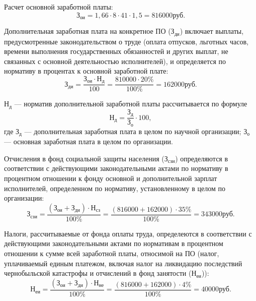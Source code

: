 Расчет основной заработной платы:
\begin{displaymath}
  \text{З}_{\text{ои}} = 1,66 \cdot 8 \cdot 41 \cdot 1,5 = 816000 \text{руб}.
\end{displaymath}

Дополнительная заработная плата на конкретное ПО (\( \text{З}_{\text{ди}} \)) включает выплаты, предусмотренные законодательством о труде (оплата отпусков, льготных часов, времени выполнения государственных обязанностей и других выплат, не связанных с основной деятельностью исполнителей), и определяется по нормативу в процентах к основной заработной плате:
\begin{displaymath}
  \text{З}_{\text{ди}} = \frac{\text{З}_{\text{ои}} \cdot \text{Н}_{\text{д}}}{100} = \frac{810000 \cdot 20\%}{100\%} = 162000 \text{руб.}
\end{displaymath}

\( \text{Н}_{\text{д}} \) --- норматив дополнительной заработной платы рассчитывается по формуле
\begin{displaymath}
  \text{Н}_{\text{д}} = \frac{\text{З}_{\text{д}}}{\text{З}_{\text{о}}} \cdot 100,
\end{displaymath}
где \( \text{З}_{\text{д}} \) --- дополнительная заработная плата в целом по научной организации; \( \text{З}_{\text{о}} \) --- основная заработная плата в целом по организации.

Отчисления в фонд социальной защиты населения (\( \text{З}_{\text{сзи}} \)) определяются в соответствии с действующими законодательными актами по нормативу в процентном отношении к фонду основной и дополнительной зарплат исполнителей, определенном по нормативу, установленному в целом по организации:
\begin{displaymath}
  \text{З}_{\text{сзи}} = \frac{(\text{З}_{\text{ои}} + \text{З}_{\text{ди}}) \cdot \text{Н}_{\text{сз}}}{100\%} = \frac{(816000 + 162000) \cdot 35\%}{100\%} = 343000 \text{руб}.
\end{displaymath}

Налоги, рассчитываемые от фонда оплаты труда, определеются в соответствии с действующими законодательными актами по нормативам в процентном отношении к сумме всей заработной платы, относимой на ПО (налог, уплачиваемый единым платежом, включая налог на ликвидацию последствий чернобыльской катастрофы и отчислений в фонд занятости (\( \text{Н}_{\text{еи}} \))):
\begin{displaymath}
  \text{Н}_{\text{еи}} = \frac{(\text{З}_{\text{ои}} + \text{З}_{\text{ди}}) \cdot \text{Н}_{\text{не}}}{100\%} = \frac{(816000 + 162000) \cdot 4\%}{100\%} = 40000 \text{руб}.
\end{displaymath}

